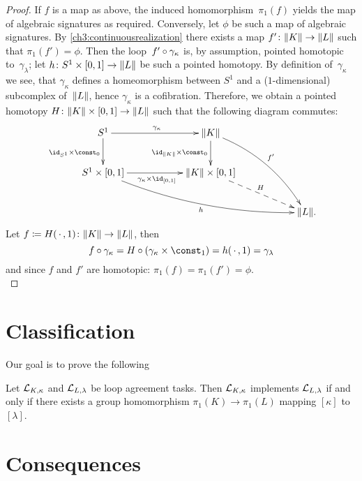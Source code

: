 \begin{proof}
    If $f$ is a map as above, the induced homomorphism~$\pi_1(f)$ yields
    the map of algebraic signatures as required. Conversely, let $\phi$
    be such a map of algebraic signatures. By \cref{ch3:continuousrealization}
    there exists a map $f'\colon\lVert K\rVert\to\lVert L\rVert$ such that $\pi_1(f')=\phi$.
    Then the loop~$f'\after\gamma_\kappa$ is, by assumption, pointed homotopic
    to~$\gamma_\lambda$; let $h\colon S^1\times[0,1]\to\lVert L\rVert$ be such a
    pointed homotopy. By definition of~$\gamma_\kappa$ we see, that
    $\gamma_\kappa$ defines a homeomorphism between $S^1$ and a
    ($1$-dimensional) subcomplex of~$\lVert L\rVert$, hence $\gamma_\kappa$
    is a cofibration. %
    Therefore, we obtain a pointed homotopy
    $H\colon\lVert K\rVert\times[0,1]\to\lVert L\rVert$ such that the following diagram
    commutes:
    \[
        \xymatrix@C=2cm{
            S^1
                \ar[r]^{\gamma_\kappa}
                \ar[d]_{\id_{S^1}\times\const_0}
            & \geom K
                \ar[d]_{\id_{\geom K}\times\const_0}
                \ar@/^1pc/[rdd]^{f'}
            \\
            S^1\times[0,1]
                \ar[r]_{\gamma_\kappa\times\id_{[0,1]}}
                \ar@/_1pc/[rrd]_h
            & \geom{K}\times[0,1]
                \ar@{-->}[rd]^H
            \\
            & & \geom L
            \rlap{.}
        }
    \]
    Let $f \coloneqq H(\,\cdot\,,1)\colon \lVert K\rVert\to \lVert L\rVert$, then
    \[ f\after\gamma_\kappa = H \after (\gamma_\kappa\times\const_1)
        = h(\scdot,1) = \gamma_\lambda
    \]
    and since $f$ and $f'$ are homotopic: $\pi_1(f) = \pi_1(f') = \phi$.
    \\
\end{proof}


\section{Classification}
Our goal is to prove the following

\begin{thTheorem}
    \label{ch3:classification}
    Let $\mathcal{L}_{K,\kappa}$ and $\mathcal{L}_{L,\lambda}$ be loop agreement tasks.
    Then $\mathcal{L}_{K,\kappa}$ implements $\mathcal{L}_{L,\lambda}$ if and only if
    there exists a group homomorphism $\pi_1(K)\to\pi_1(L)$ mapping
    $[\kappa]$ to $[\lambda]$.
\end{thTheorem}


\section{Consequences}
\label{ch2:sec:consequences}
